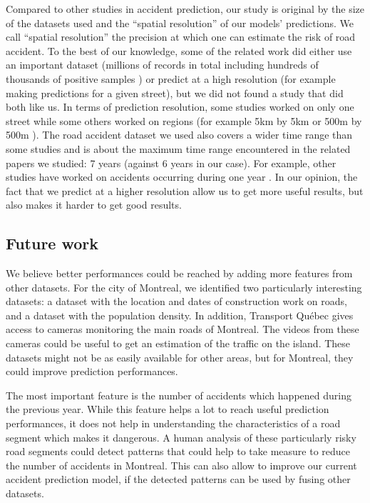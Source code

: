 \documentclass[conference]{IEEEtran}
\begin{document}
Compared to other studies in accident prediction, our study is original by the size of the datasets used and the ``spatial resolution'' of our models' predictions. We call ``spatial resolution'' the precision at which one can estimate the risk of road accident. To the best of our knowledge, some of the related work did either use an important dataset (millions of records in total including hundreds of thousands of positive samples \cite{QChen2016}) or predict at a high resolution (for example making predictions for a given street), but we did not found a study that did both like us. In terms of prediction resolution, some studies worked on only one street \cite{Chang2005} \cite{Chang2005b} \cite{Lin2015} while some others worked on regions (for example 5km by 5km \cite{QChen2016} or 500m by 500m \cite{Yuan2018}). The road accident dataset we used also covers a wider time range than some studies and is about the maximum time range encountered in the related papers we studied: 7 years \cite{Yuan2018} (against 6 years in our case). For example, other studies have worked on accidents occurring during one year \cite{Chang2005} \cite{Chang2005b} \cite{QChen2016} \cite{Lin2015}. In our opinion, the fact that we predict at a higher resolution allow us to get more useful results, but also makes it harder to get good results.


\subsection{Future work}

We believe better performances could be reached by adding more features
from other datasets. For the city of Montreal, we identified two
particularly interesting datasets: a dataset with the location and dates of
construction work on roads, and a dataset with the population density.
In addition, Transport Qu\'ebec gives access to cameras monitoring the main
roads of Montreal. The videos from these cameras could be useful to get an
estimation of the traffic on the island. These datasets might not be as
easily available for other areas, but for Montreal, they could improve 
prediction performances.

The most important feature is the number of accidents which happened during
the previous year. While this feature helps a lot to reach useful prediction
performances, it does not help in understanding the characteristics of a
road segment which makes it dangerous. A human analysis of these
particularly risky road segments could detect patterns that could help to
take measure to reduce the number of accidents in Montreal. This can also
allow to improve our current accident prediction model, if the detected
patterns can be used by fusing other datasets.
\end{document}

